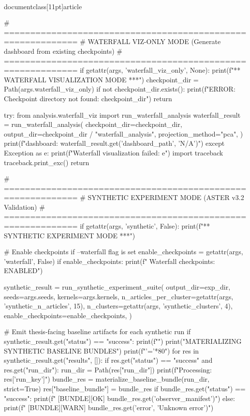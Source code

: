 \\documentclass[11pt]{article}
\begin{document}
\begin{CodeBlock}
    # ============================================================
    # WATERFALL VIZ-ONLY MODE (Generate dashboard from existing checkpoints)
    # ============================================================
    if getattr(args, 'waterfall_viz_only', None):
        print(f"\n*** WATERFALL VISUALIZATION MODE ***")
        checkpoint_dir = Path(args.waterfall_viz_only)
        if not checkpoint_dir.exists():
            print(f"ERROR: Checkpoint directory not found: {checkpoint_dir}")
            return

        try:
            from analysis.waterfall_viz import run_waterfall_analysis
            waterfall_result = run_waterfall_analysis(
                checkpoint_dir=checkpoint_dir,
                output_dir=checkpoint_dir / "waterfall_analysis",
                projection_method="pca",
            )
            print(f"\nWaterfall dashboard: {waterfall_result.get('dashboard_path', 'N/A')}")
        except Exception as e:
            print(f"Waterfall visualization failed: {e}")
            import traceback
            traceback.print_exc()
        return

    # ============================================================
    # SYNTHETIC EXPERIMENT MODE (ASTER v3.2 Validation)
    # ============================================================
    if getattr(args, 'synthetic', False):
        print(f"\n*** SYNTHETIC EXPERIMENT MODE ***")

        # Enable checkpoints if --waterfall flag is set
        enable_checkpoints = getattr(args, 'waterfall', False)
        if enable_checkpoints:
            print(f"  Waterfall checkpoints: ENABLED")

        synthetic_result = run_synthetic_experiment_suite(
            output_dir=exp_dir,
            seeds=args.seeds,
            kernels=args.kernels,
            n_articles_per_cluster=getattr(args, 'synthetic_n_articles', 15),
            n_clusters=getattr(args, 'synthetic_clusters', 4),
            enable_checkpoints=enable_checkpoints,
        )

        # Emit thesis-facing baseline artifacts for each synthetic run
        if synthetic_result.get("status") == "success":
            print(f"")
            print("MATERIALIZING SYNTHETIC BASELINE BUNDLES")
            print(f"{'='*80}")
            for res in synthetic_result.get("results", []):
                if res.get("status") == "success" and res.get("run_dir"):
                    run_dir = Path(res["run_dir"])
                    print(f"\n  Processing: {res['run_key']}")
                    bundle_res = materialize_baseline_bundle(run_dir, strict=True)
                    res["baseline_bundle"] = bundle_res
                    if bundle_res.get("status") == "success":
                        print(f"    [BUNDLE][OK] {bundle_res.get('observer_manifest')}")
                    else:
                        print(f"    [BUNDLE][WARN] {bundle_res.get('error', 'Unknown error')}")


\end{CodeBlock}
\end{document}
